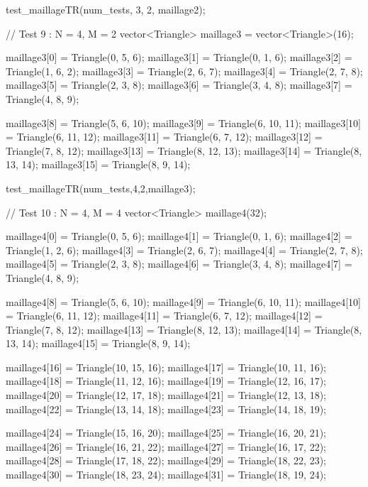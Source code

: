 \begin{codeblock}
{    test_maillageTR(num_tests, 3, 2, maillage2);







    // Test 9 : N = 4, M = 2
    vector<Triangle> maillage3 = vector<Triangle>(16);

    maillage3[0] = Triangle(0, 5, 6);
    maillage3[1] = Triangle(0, 1, 6);
    maillage3[2] = Triangle(1, 6, 2);
    maillage3[3] = Triangle(2, 6, 7);
    maillage3[4] = Triangle(2, 7, 8);
    maillage3[5] = Triangle(2, 3, 8);
    maillage3[6] = Triangle(3, 4, 8);
    maillage3[7] = Triangle(4, 8, 9);

    maillage3[8] = Triangle(5, 6, 10);
    maillage3[9] = Triangle(6, 10, 11);
    maillage3[10] = Triangle(6, 11, 12);
    maillage3[11] = Triangle(6, 7, 12);
    maillage3[12] = Triangle(7, 8, 12);
    maillage3[13] = Triangle(8, 12, 13);
    maillage3[14] = Triangle(8, 13, 14);
    maillage3[15] = Triangle(8, 9, 14);

    test_maillageTR(num_tests,4,2,maillage3);



    // Test 10 : N = 4, M = 4
    vector<Triangle> maillage4(32);

    maillage4[0]  = Triangle(0, 5, 6);
    maillage4[1]  = Triangle(0, 1, 6);
    maillage4[2]  = Triangle(1, 2, 6);
    maillage4[3]  = Triangle(2, 6, 7);
    maillage4[4]  = Triangle(2, 7, 8);
    maillage4[5]  = Triangle(2, 3, 8);
    maillage4[6]  = Triangle(3, 4, 8);
    maillage4[7]  = Triangle(4, 8, 9);

    maillage4[8]  = Triangle(5, 6, 10);
    maillage4[9]  = Triangle(6, 10, 11);
    maillage4[10] = Triangle(6, 11, 12);
    maillage4[11] = Triangle(6, 7, 12);
    maillage4[12] = Triangle(7, 8, 12);
    maillage4[13] = Triangle(8, 12, 13);
    maillage4[14] = Triangle(8, 13, 14);
    maillage4[15] = Triangle(8, 9, 14);

    maillage4[16] = Triangle(10, 15, 16);
    maillage4[17] = Triangle(10, 11, 16);
    maillage4[18] = Triangle(11, 12, 16);
    maillage4[19] = Triangle(12, 16, 17);
    maillage4[20] = Triangle(12, 17, 18);
    maillage4[21] = Triangle(12, 13, 18);
    maillage4[22] = Triangle(13, 14, 18);
    maillage4[23] = Triangle(14, 18, 19);

    maillage4[24] = Triangle(15, 16, 20);
    maillage4[25] = Triangle(16, 20, 21);
    maillage4[26] = Triangle(16, 21, 22);
    maillage4[27] = Triangle(16, 17, 22);
    maillage4[28] = Triangle(17, 18, 22);
    maillage4[29] = Triangle(18, 22, 23);
    maillage4[30] = Triangle(18, 23, 24);
    maillage4[31] = Triangle(18, 19, 24);

}
\end{codeblock}
